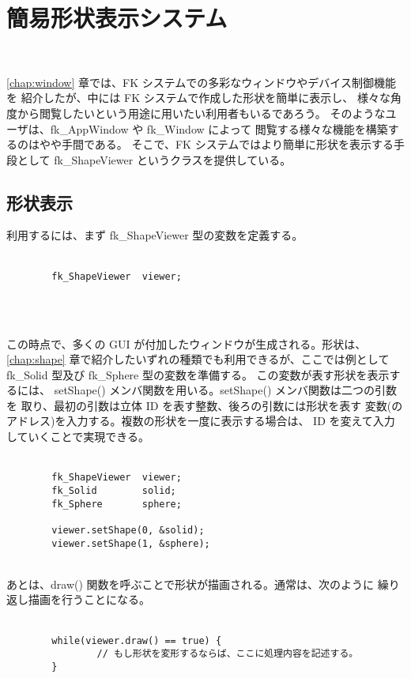 \chapter{簡易形状表示システム} \label{chap:viewer} ~

\ref{chap:window} 章では、FK システムでの多彩なウィンドウやデバイス制御機能を
紹介したが、中には FK システムで作成した形状を簡単に表示し、
様々な角度から閲覧したいという用途に用いたい利用者もいるであろう。
そのようなユーザは、fk\_AppWindow や fk\_Window によって
閲覧する様々な機能を構築するのはやや手間である。
そこで、FK システムではより簡単に形状を表示する手段として
fk\_ShapeViewer というクラスを提供している。

\section{形状表示}
利用するには、まず fk\_ShapeViewer 型の変数を定義する。\\ ~ \\
\begin{screen}
\begin{verbatim}
        fk_ShapeViewer  viewer;
\end{verbatim}
\end{screen}
\\ ~

この時点で、多くの GUI が付加したウィンドウが生成される。形状は、
\ref{chap:shape} 章で紹介したいずれの種類でも利用できるが、ここでは例として
fk\_Solid 型及び fk\_Sphere 型の変数を準備する。
この変数が表す形状を表示するには、
setShape() メンバ関数を用いる。setShape() メンバ関数は二つの引数を
取り、最初の引数は立体 ID を表す整数、後ろの引数には形状を表す
変数(のアドレス)を入力する。複数の形状を一度に表示する場合は、
ID を変えて入力していくことで実現できる。\\ ~ \\
\begin{breakbox}
\begin{verbatim}
        fk_ShapeViewer  viewer;
        fk_Solid        solid;
        fk_Sphere       sphere;

        viewer.setShape(0, &solid);
        viewer.setShape(1, &sphere);
\end{verbatim}
\end{breakbox}
~ \\

あとは、draw() 関数を呼ぶことで形状が描画される。通常は、次のように
繰り返し描画を行うことになる。\\ ~ \\
\begin{breakbox}
\begin{verbatim}
        while(viewer.draw() == true) {
                // もし形状を変形するならば、ここに処理内容を記述する。
        }
\end{verbatim}
\end{breakbox}
~ \\

